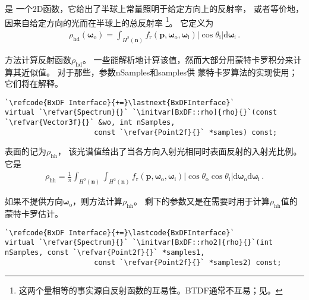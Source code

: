 是
一个2D函数，它给出了半球上常量照明于给定方向上的反射率，
或者等价地，因来自给定方向的光而在半球上的总反射率
\footnote{这两个量相等的事实源自反射函数的互易性。BTDF通常不互易；见。}。
它定义为
\begin{align}
    \label{eq:8.1}
    \rho_{\mathrm{hd}}({\bm\omega}_{\mathrm{o}})=\int_{H^2({\bm n})}{f_{\mathrm{r}}({\bm p},{\bm \omega}_\mathrm{o},{\bm \omega}_\mathrm{i})|\cos{\theta_{\mathrm{i}}}|\mathrm{d}{\bm \omega}_\mathrm{i}}\, .
\end{align}

方法计算反射函数$\rho_{\mathrm{hd}}$。
一些能解析地计算该值，然而大部分用蒙特卡罗积分来计算其近似值。
对于那些，参数{\ttfamily nSamples}和{\ttfamily samples}供
蒙特卡罗算法的实现使用；它们将在解释。
\begin{lstlisting}
`\refcode{BxDF Interface}{+=}\lastnext{BxDFInterface}`
virtual `\refvar{Spectrum}{}` `\initvar[BxDF::rho]{rho}{}`(const `\refvar{Vector3f}{}` &wo, int nSamples,
                     const `\refvar{Point2f}{}` *samples) const;
\end{lstlisting}

表面的记为$\rho_{\mathrm{hh}}$，
该光谱值给出了当各方向入射光相同时表面反射的入射光比例。它是
\begin{align}
    \rho_{\mathrm{hh}}=\frac{1}{\pi}\int_{H^2({\bm n})}\int_{H^2({\bm n})}f_{\mathrm{r}}({\bm p},{\bm \omega}_\mathrm{o},{\bm \omega}_\mathrm{i})|\cos{\theta_{\mathrm{o}}}\cos{\theta_{\mathrm{i}}}|\mathrm{d}{\bm \omega}_\mathrm{o}\mathrm{d}{\bm \omega}_\mathrm{i}\, .
\end{align}

如果不提供方向${\bm\omega}_\mathrm{o}$，则方法计算$\rho_{\mathrm{hh}}$。
剩下的参数又是在需要时用于计算$\rho_{\mathrm{hh}}$值的蒙特卡罗估计。
\begin{lstlisting}
`\refcode{BxDF Interface}{+=}\lastcode{BxDFInterface}`
virtual `\refvar{Spectrum}{}` `\initvar[BxDF::rho2]{rho}{}`(int nSamples, const `\refvar{Point2f}{}` *samples1,
                     const `\refvar{Point2f}{}` *samples2) const;
\end{lstlisting}

